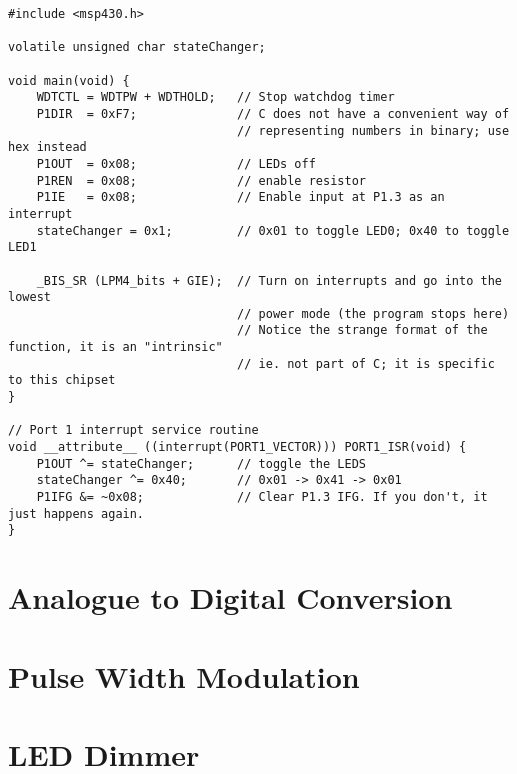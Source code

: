 \documentclass[letterpaper]{article}
\begin{document}
		\begin{verbatim}
#include <msp430.h>

volatile unsigned char stateChanger;

void main(void) {
    WDTCTL = WDTPW + WDTHOLD;   // Stop watchdog timer
    P1DIR  = 0xF7;              // C does not have a convenient way of
                                // representing numbers in binary; use hex instead
    P1OUT  = 0x08;              // LEDs off
    P1REN  = 0x08;              // enable resistor
    P1IE   = 0x08;              // Enable input at P1.3 as an interrupt
    stateChanger = 0x1;         // 0x01 to toggle LED0; 0x40 to toggle LED1

    _BIS_SR (LPM4_bits + GIE);  // Turn on interrupts and go into the lowest
                                // power mode (the program stops here)
                                // Notice the strange format of the function, it is an "intrinsic"
                                // ie. not part of C; it is specific to this chipset
}

// Port 1 interrupt service routine
void __attribute__ ((interrupt(PORT1_VECTOR))) PORT1_ISR(void) {
    P1OUT ^= stateChanger;      // toggle the LEDS
    stateChanger ^= 0x40;       // 0x01 -> 0x41 -> 0x01
    P1IFG &= ~0x08;             // Clear P1.3 IFG. If you don't, it just happens again.
}
		\end{verbatim}
	
	\section{Analogue to Digital Conversion}
	
	\section{Pulse Width Modulation}
	
	\section{LED Dimmer}
\end{document}
